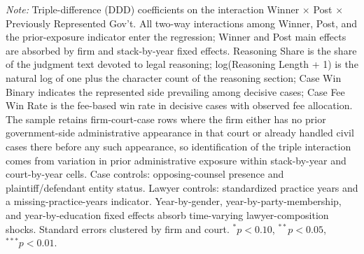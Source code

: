 \begin{table}[!htbp]
\begin{threeparttable}
\begin{tablenotes}[flushleft]
\item \textit{Note:} Triple-difference (DDD) coefficients on the interaction Winner $\times$ Post $\times$ Previously Represented Gov't. All two-way interactions among Winner, Post, and the prior-exposure indicator enter the regression; Winner and Post main effects are absorbed by firm and stack-by-year fixed effects. Reasoning Share is the share of the judgment text devoted to legal reasoning; log(Reasoning Length + 1) is the natural log of one plus the character count of the reasoning section; Case Win Binary indicates the represented side prevailing among decisive cases; Case Fee Win Rate is the fee-based win rate in decisive cases with observed fee allocation. The sample retains firm-court-case rows where the firm either has no prior government-side administrative appearance in that court or already handled civil cases there before any such appearance, so identification of the triple interaction comes from variation in prior administrative exposure within stack-by-year and court-by-year cells. Case controls: opposing-counsel presence and plaintiff/defendant entity status. Lawyer controls: standardized practice years and a missing-practice-years indicator. Year-by-gender, year-by-party-membership, and year-by-education fixed effects absorb time-varying lawyer-composition shocks. Standard errors clustered by firm and court. $^{*}p<0.10$, $^{**}p<0.05$, $^{***}p<0.01$.
\end{tablenotes}
\end{threeparttable}
\end{table}
